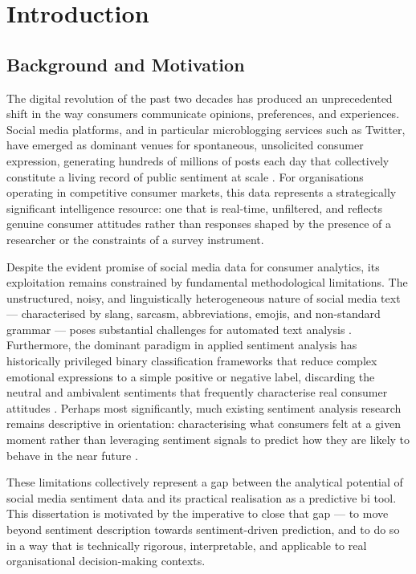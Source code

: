 \chapter{Introduction}
\label{ch:intro}

\section{Background and Motivation}

The digital revolution of the past two decades has produced an unprecedented shift in the way consumers communicate opinions, preferences, and experiences. Social media platforms, and in particular microblogging services such as Twitter, have emerged as dominant venues for spontaneous, unsolicited consumer expression, generating hundreds of millions of posts each day that collectively constitute a living record of public sentiment at scale \citep{antczak2024influence}. For organisations operating in competitive consumer markets, this data represents a strategically significant intelligence resource: one that is real-time, unfiltered, and reflects genuine consumer attitudes rather than responses shaped by the presence of a researcher or the constraints of a survey instrument.

Despite the evident promise of social media data for consumer analytics, its exploitation remains constrained by fundamental methodological limitations. The unstructured, noisy, and linguistically heterogeneous nature of social media text --- characterised by slang, sarcasm, abbreviations, emojis, and non-standard grammar --- poses substantial challenges for automated text analysis \citep{adeyemi2025influence}. Furthermore, the dominant paradigm in applied sentiment analysis has historically privileged binary classification frameworks that reduce complex emotional expressions to a simple positive or negative label, discarding the neutral and ambivalent sentiments that frequently characterise real consumer attitudes \citep{mohammad2013crowdsourcing}. Perhaps most significantly, much existing sentiment analysis research remains descriptive in orientation: characterising what consumers felt at a given moment rather than leveraging sentiment signals to predict how they are likely to behave in the near future \citep{pak2010twitter}.

These limitations collectively represent a gap between the analytical potential of social media sentiment data and its practical realisation as a predictive \gls{bi} tool. This dissertation is motivated by the imperative to close that gap --- to move beyond sentiment description towards sentiment-driven prediction, and to do so in a way that is technically rigorous, interpretable, and applicable to real organisational decision-making contexts.

